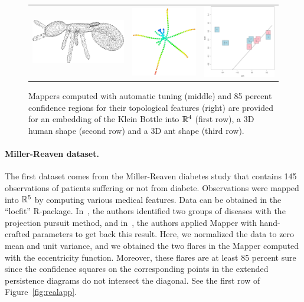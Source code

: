 \begin{figure}
\begin{tabular}{ccc}
\includegraphics[width=6.5cm]{figures/81} & \includegraphics[width=4.5cm]{figures/81_mappercoord2_subs100_g40.pdf} & \includegraphics[width=5cm]{figures/81_conf85_boot100.pdf} \\
\end{tabular}
\caption[Automatic Mappers on smooth datasets]{\label{fig:synthdata} Mappers computed with automatic tuning (middle) and 85 percent confidence regions for their topological features (right) are provided for
an embedding of the Klein Bottle into $\mathbb{R}^4$ (first row), a 3D human shape (second row) and a 3D ant shape (third row). }
\end{figure}

\paragraph{Miller-Reaven dataset.} 
The first dataset comes from the Miller-Reaven diabetes study that contains 145 observations of patients suffering or not from diabete.
Observations were mapped into $\mathbb{R}^5$ by computing various medical features.
Data can be obtained in the ``locfit'' R-package. 
In~\cite{Reaven79}, the authors identified two groups of diseases
with the projection pursuit method, and in~\cite{Singh07}, the authors applied Mapper with hand-crafted parameters to get back this result.
Here, we normalized the data to zero mean and unit variance, and we obtained the two flares in the Mapper computed with the eccentricity function.
Moreover, these flares are at least 85 percent sure since the confidence squares on the corresponding
points in the extended persistence diagrams do not intersect the diagonal.
See the first row of Figure~\ref{fig:realapp}.

